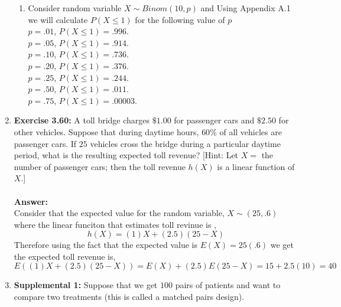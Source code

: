 \documentclass[12pt]{article}
\theoremstyle{homework}
\begin{document}
\begin{enumerate}
\begin{enumerate}
\item Consider random variable $X\sim Binom(10,p)$ and Using Appendix A.1 we will calculate $P(X \le 1)$ for the following value of $p$\\

$ p = .01$, $P(X\le 1)=.996$.\\
$ p = .05$, $P(X\le 1)=.914$.\\
$ p = .10$, $P(X\le 1)=.736$.\\
$ p = .20$, $P(X\le 1)=.376$.\\
$ p = .25$, $P(X\le 1)=.244$.\\
$ p = .50$, $P(X\le 1)=.011$.\\
$ p = .75$, $P(X\le 1)=.00003$.\\

\end{enumerate}
\vspace{.5in}








\item\hspace{.5in}\textbf{Exercise 3.60:} A toll bridge charges $\$1.00$ for passenger cars and $\$2.50$ for other vehicles. Suppose that during daytime hours, $60\%$ of all vehicles are passenger cars. If $25$ vehicles cross the bridge during a particular daytime period, what is the resulting expected toll revenue? [Hint: Let $X= $ the number of passenger cars; then the toll revenue $h(X)$ is a linear function of $X$.]\\
\\
\textbf{Answer:} \\
Consider that the expected value for the random variable, $X \sim (25, .6)$ where the linear funciton that estimates toll revinue is ,
\begin{equation*}
  h(X) = (1)X+(2.5)(25 - X)
\end{equation*}
Therefore using the fact that the expected value is $E(X) = 25(.6)$ we get the expected toll revenue is,
\begin{equation*}
  E((1)X+(2.5)(25 - X)) = E(X)+(2.5)E(25 - X) = 15 + 2.5(10) = 40 
\end{equation*}
\vspace{.5in}

\item\hspace{.5in}\textbf{Supplemental 1:} Suppose that we get $100$ pairs of patients and want to compare two treatments (this is called a matched pairs design).\\


\end{enumerate}
\end{document}
